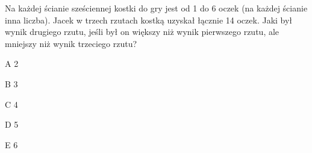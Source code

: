 \begin{tresc}
Na każdej ścianie sześciennej kostki do gry jest od 1 do 6 oczek (na każdej ścianie inna liczba). Jacek w trzech rzutach kostką uzyskał łącznie 14 oczek. Jaki był wynik drugiego rzutu, jeśli był on większy niż wynik pierwszego rzutu, ale mniejszy niż wynik trzeciego rzutu?
\end{tresc}
\begin{wariant}{A} 2 \end{wariant}
\begin{wariant}{B} 3 \end{wariant}
\begin{wariant}{C} 4 \end{wariant}
\begin{wariant}{D} 5 \end{wariant}
\begin{wariant}{E} 6 \end{wariant}
